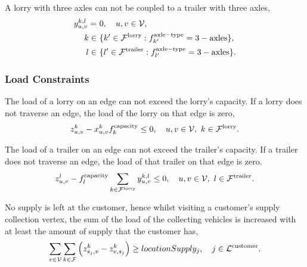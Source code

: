  A lorry with three axles can not be coupled to a trailer with three axles,
 \begin{align}
   \label{eq:vehicle-compatibility}
   y^{k,l}_{u,v} = \ & 0, \quad u,v \in \mathcal V ,\\
   k \in \ & \{ k' \in \mathcal{F}^{\rm lorry} : f^{\rm axle-type}_{k'} = {\rm 3-axles} \} , \notag \\
  \ l \in \  & \{ l' \in \mathcal{F}^{\rm trailer} : f^{\rm axle-type}_{l'} = {\rm 3-axles} \} \notag  .
 \end{align}






\subsubsection{Load Constraints}



The load of a lorry on an edge can not exceed the lorry's capacity.
If a lorry does not traverse an edge, the load of the lorry on that edge is zero,
\begin{align}
  z_{u,v}^k  - x^{k}_{u,v}  f_k^{\rm capacity}  \leq 0, \quad
  u,v \in \mathcal V,
  \ k \in \mathcal F^{\rm lorry}.
\end{align}



The load of a trailer on an edge can not exceed the trailer's capacity. If a trailer does not traverse an edge, the load of that trailer on that edge is zero.
\begin{align}
  z_{u,v}^l  - f_l^{\rm capacity}  \sum_{ k \in \mathcal F^{\rm lorry} } y^{k,l}_{u,v}   \leq 0, \quad
  u,v \in \mathcal V,
  \ l \in \mathcal F^{\rm trailer}.
\end{align}



No supply is left at the customer, hence
whilst visiting a customer's supply collection vertex, the sum of the load of the collecting vehicles is increased with at least the amount of supply that the customer has,
\begin{align}
  \label{eq:supply}
  \sum_{v \in \mathcal V}
  \sum_{ k \in \mathcal F }
  \left(
    z^k_{s_j,v}
  -
    z^k_{v,s_j}
  \right)
    \geq locationSupply_j, \quad
    j \in \mathcal L^{\rm customer}.
\end{align}






